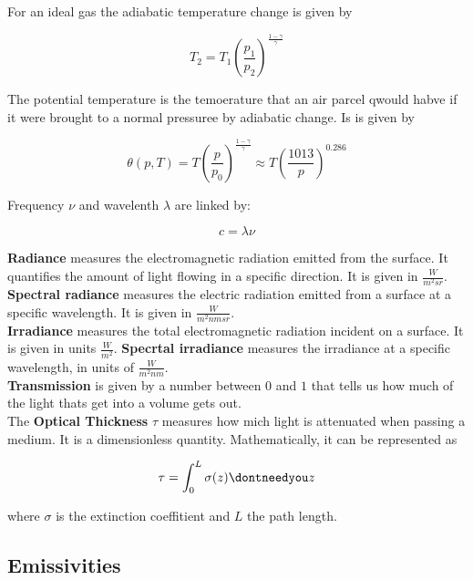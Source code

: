 \documentclass[12pt, a4paper]{article} %
\let\d\dontneedyou
\DeclareMathOperator{\d}{d}
\newcommand{\para}[1]{\left({#1}\right)}
\begin{document}
For an ideal gas the adiabatic temperature  change is given by

\begin{equation}
	T_2 = T_1 \para{\frac{p_1}{p_2}}^{\frac{1 - \gamma}{\gamma}}
\end{equation}

The potential temperature is the temoerature that an air parcel qwould habve if it were brought to a normal pressuree by adiabatic change. Is is given by

\begin{equation}
	\theta(p, T) = T \para{\frac{p}{p_0}}^{\frac{1 - \gamma}{\gamma}} \approx T \para{\frac{1013}{p}}^{0.286}
\end{equation}

Frequency $\nu$ and wavelenth $\lambda$ are linked by:

\begin{equation}
	c = \lambda \nu
\end{equation}

\textbf{Radiance} measures the electromagnetic radiation emitted from the surface. It quantifies the amount of light flowing in a specific direction. It is given in $\frac{W}{m^2sr}$. \textbf{Spectral radiance} measures the electric radiation emitted from a surface at a specific wavelength. It is given in $\frac{W}{m^2 nm sr}$. \\

\textbf{Irradiance} measures the total electromagnetic radiation incident on a surface. It is given in units $\frac{W}{m^2}$. \textbf{Specrtal irradiance} measures the irradiance at a specific wavelength, in units of $\frac{W}{m^2nm}$. \\

\textbf{Transmission} is given by a number between $0$ and $1$ that tells us how much of the light thats get into a volume gets out. \\

The \textbf{Optical Thickness} $\tau$ measures how mich light is attenuated when passing a medium. It is a dimensionless quantity. Mathematically, it can be represented as

\begin{equation}
	\tau = \int_0^L \sigma(z) \d z
\end{equation}

where $\sigma$ is the extinction coeffitient and $L$ the path length.

\subsection{Emissivities}
\end{document}
